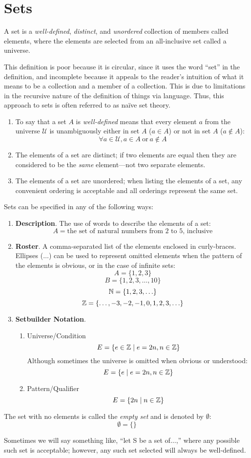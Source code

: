 \documentclass[letterpaper,12pt,fleqn]{article}
\newcommand{\U}{\mathcal{U}}
\newcommand{\E}{\emptyset}
\begin{document}
\section*{Sets}
\begin{definition}
A set is a \emph{well-defined}, \emph{distinct}, and \emph{unordered}
collection of members called elements, where the elements are selected from
an all-inclusive set called a universe.
\end{definition}
This definition is poor because it is circular, since it uses the word ``set''
in the definition, and incomplete because it appeals to the reader's intuition
of what it means to be a collection and a member of a collection. This is due to
limitations in the recursive nature of the definition of things via language.
Thus, this approach to sets is often referred to as na\"{i}ve set theory.
\begin{properties}
\listbreak
\begin{enumerate}
\item To say that a set $A$ is \emph{well-defined} means that every element $a$
from the universe $\U$ is unambiguously either in set $A$ ($a\in A$) or not in
set $A$ ($a\notin A$):
\[\forall a\in\U,a\in A\ \mbox{or}\ a\notin A\]

\item The elements of a set are distinct; if two elements are equal then they
are considered to be the \emph{same} element---not two separate elements.

\item The elements of a set are unordered; when listing the elements of a set,
any convenient ordering is acceptable and all orderings represent the same set.
\end{enumerate}
\end{properties}
\begin{notation}
Sets can be specified in any of the following ways:
\begin{enumerate}
\item \textbf{Description}. The use of words to describe the elements of a set:
\[A=\mbox{the set of natural numbers from 2 to 5, inclusive}\]
\item \textbf{Roster}. A comma-separated list of the elements enclosed in
curly-braces. Ellipses ($\ldots$) can be used to represent omitted elements
when the pattern of the elements is obvious, or in the case of infinite sets:
\[A=\{1,2,3\}\]
\[B=\{1,2,3,\ldots,10\}\]
\[\mathbb{N}=\{1,2,3,\ldots\}\]
\[\mathbb{Z}=\{\ldots,-3,-2,-1,0,1,2,3,\ldots\}\]
\newpage
\item \textbf{Setbuilder Notation}.
\begin{enumerate}
\item Universe/Condition
\[E=\{e\in\mathbb{Z}\mid e=2n,n\in\mathbb{Z}\}\]
Although sometimes the universe is omitted when obvious or understood:
\[E=\{e\mid e=2n,n\in\mathbb{Z}\}\]
\item Pattern/Qualifier
\[E=\{2n\mid n\in\mathbb{Z}\}\]
\end{enumerate}
\end{enumerate}
\end{notation}
\begin{definition}
The set with no elements is called the \emph{empty set} and is denoted by $\E$:
\[\E=\{\}\]
\end{definition}
Sometimes we will say something like, ``let S be a set of$\ldots$,'' where any
possible such set is acceptable; however, any such set selected will always be
well-defined.
\end{document}
